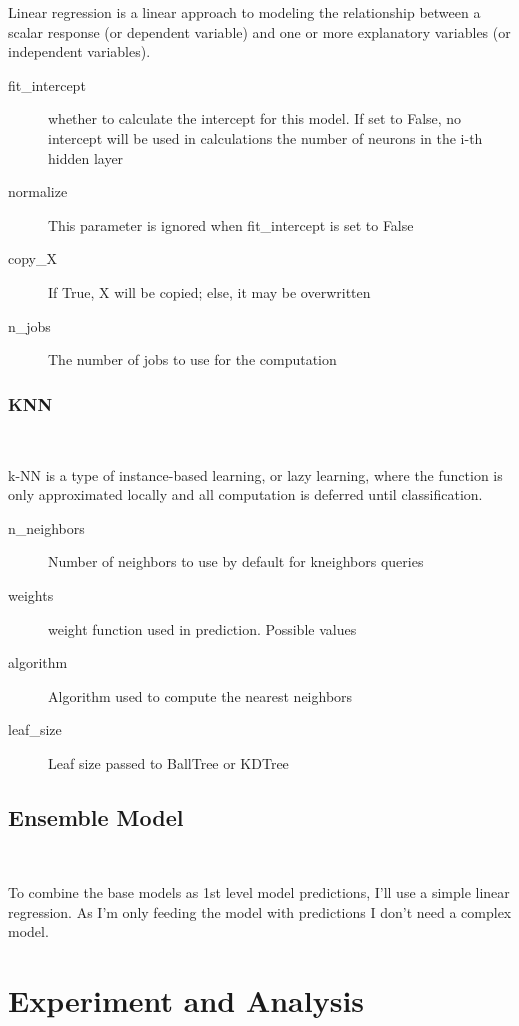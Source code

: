 Linear regression is a linear approach to 
modeling the relationship between a scalar 
response (or dependent variable) and one 
or more explanatory variables (or 
independent variables). 


\begin{description}
	\item[fit_intercept] whether to calculate the intercept for this model. If 
	set to False, no intercept will be used in calculations 
	the number of neurons in the i-th hidden layer
	\item[normalize] This parameter is ignored when fit_intercept is set to 
	False
	\item[copy_X] If True, X will be copied; else, it may be overwritten
	\item[n_jobs] The number of jobs to use for the computation
\end{description}

\subsubsection{KNN}
\

k-NN is a type of instance-based learning, 
or lazy learning, where the function is 
only approximated locally and all 
computation is deferred until classification. 


\begin{description}
	\item[n_neighbors] Number of neighbors to use by default for kneighbors 
	queries
	\item[weights] weight function used in prediction. Possible values
	\item[algorithm] Algorithm used to compute the nearest neighbors
	\item[leaf_size] Leaf size passed to BallTree or KDTree
\end{description}

\subsection{Ensemble Model}
\

To combine the base models as 1st level 
model predictions, I'll use a simple 
linear regression. As I'm only feeding 
the model with predictions 
I don't need a complex model.

\section{Experiment and Analysis}

